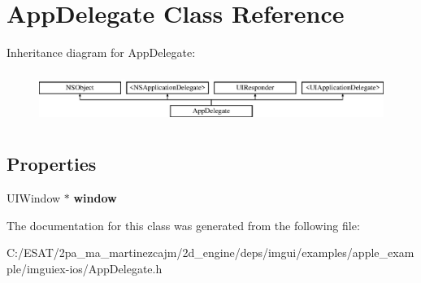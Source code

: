 \hypertarget{interface_app_delegate}{}\section{App\+Delegate Class Reference}
\label{interface_app_delegate}
Inheritance diagram for App\+Delegate\+:\begin{figure}[H]
\begin{center}
\leavevmode
\includegraphics[height=1.707317cm]{interface_app_delegate}
\end{center}
\end{figure}
\subsection*{Properties}
\begin{DoxyCompactItemize}
\item 
\mbox{\label{interface_app_delegate_acf48ac24125e688cac1a85445cd7fac2}} 
U\+I\+Window $\ast$ {\bfseries window}
\end{DoxyCompactItemize}


The documentation for this class was generated from the following file\+:\begin{DoxyCompactItemize}
\item 
C\+:/\+E\+S\+A\+T/2pa\+\_\+ma\+\_\+martinezcajm/2d\+\_\+engine/deps/imgui/examples/apple\+\_\+example/imguiex-\/ios/App\+Delegate.\+h\end{DoxyCompactItemize}
